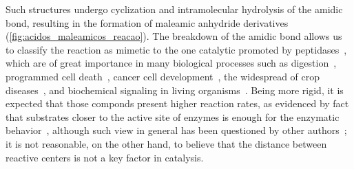 %
Such structures undergo cyclization and intramolecular hydrolysis of the amidic
bond, resulting in the formation of maleamic anhydride derivatives (\cref{fig:acidos_maleamicos_reacao}).
The breakdown of the amidic bond allows us to classify the reaction as mimetic
to the one catalytic promoted by peptidases~\cite{Kirby_1972},
which are of great importance in many biological processes such as
digestion~\cite{Lehninger_2012}, programmed cell death~\cite{Fesik_2001},
cancer cell development~\cite{Kenny_1989},
the widespread of crop diseases~\cite{Kapust_2000},
and biochemical signaling in living
organisms~\cite{Lehninger_2012,Borissoff_2009}.
Being more rigid, it is expected that those componds present higher reaction
rates, as evidenced by fact that substrates closer to the active site of
enzymes is enough for the enzymatic behavior~\cite{Souza_2017},
although such view in general has been questioned by other authors~\cite{Nobel_2013};
it is not reasonable, on the other hand, to believe that the distance between
reactive centers is not a key factor in catalysis.
